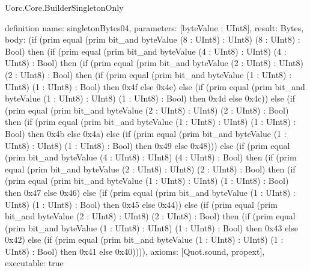 \begin{lexlean}{Uorc.Core.BuilderSingletonOnly}
\begin{semanticmodule}
definition{
  name: singletonBytes04,
  parameters: [byteValue : UInt8],
  result: Bytes,
  body: (if (prim equal (prim bit_and byteValue (8 : UInt8) : UInt8) (8 : UInt8) : Bool) then (if (prim equal (prim bit_and byteValue (4 : UInt8) : UInt8) (4 : UInt8) : Bool) then (if (prim equal (prim bit_and byteValue (2 : UInt8) : UInt8) (2 : UInt8) : Bool) then (if (prim equal (prim bit_and byteValue (1 : UInt8) : UInt8) (1 : UInt8) : Bool) then 0x4f else 0x4e) else (if (prim equal (prim bit_and byteValue (1 : UInt8) : UInt8) (1 : UInt8) : Bool) then 0x4d else 0x4c)) else (if (prim equal (prim bit_and byteValue (2 : UInt8) : UInt8) (2 : UInt8) : Bool) then (if (prim equal (prim bit_and byteValue (1 : UInt8) : UInt8) (1 : UInt8) : Bool) then 0x4b else 0x4a) else (if (prim equal (prim bit_and byteValue (1 : UInt8) : UInt8) (1 : UInt8) : Bool) then 0x49 else 0x48))) else (if (prim equal (prim bit_and byteValue (4 : UInt8) : UInt8) (4 : UInt8) : Bool) then (if (prim equal (prim bit_and byteValue (2 : UInt8) : UInt8) (2 : UInt8) : Bool) then (if (prim equal (prim bit_and byteValue (1 : UInt8) : UInt8) (1 : UInt8) : Bool) then 0x47 else 0x46) else (if (prim equal (prim bit_and byteValue (1 : UInt8) : UInt8) (1 : UInt8) : Bool) then 0x45 else 0x44)) else (if (prim equal (prim bit_and byteValue (2 : UInt8) : UInt8) (2 : UInt8) : Bool) then (if (prim equal (prim bit_and byteValue (1 : UInt8) : UInt8) (1 : UInt8) : Bool) then 0x43 else 0x42) else (if (prim equal (prim bit_and byteValue (1 : UInt8) : UInt8) (1 : UInt8) : Bool) then 0x41 else 0x40)))),
  axioms: [Quot.sound, propext],
  executable: true
}


\end{semanticmodule}
\end{lexlean}
